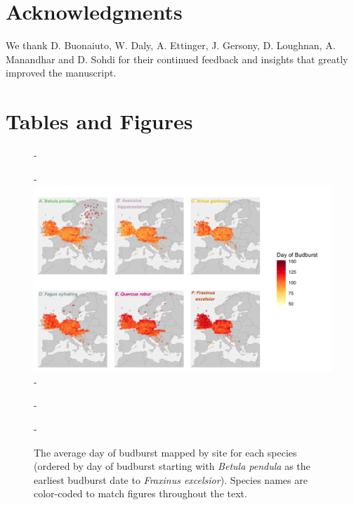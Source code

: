 \documentclass{article}\usepackage[]{graphicx}\usepackage[]{color}
\begin{document}
\section*{Acknowledgments}

We thank D. Buonaiuto, W. Daly, A. Ettinger, J. Gersony, D. Loughnan, A. Manandhar and D. Sohdi for their continued feedback and insights that greatly improved the manuscript.



\section*{Tables and Figures} 

{\begin{figure} [H]
  -\begin{center}
  -\includegraphics[width=14cm]{..//analyses/figures/BB_base.png}
  -\caption{The average day of budburst mapped by site for each species (ordered by day of budburst starting with \textit{Betula pendula} as the earliest budburst date to \textit{Fraxinus excelsior}). Species names are color-coded to match figures throughout the text. }\label{fig:bbmap}
  -\end{center}
  -\end{figure}}
  
\end{document}
